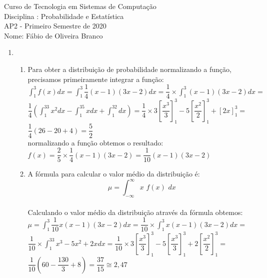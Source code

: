 \documentclass[a4paper, 12pt]{article}
\begin{document}
\begin{center}
Curso de Tecnologia em Sistemas de Computação \\
Disciplina : Probabilidade e Estatística \\
AP2 - Primeiro Semestre de 2020 \\
Nome: Fábio de Oliveira Branco\\ 
\end{center}


\begin{enumerate}
\item \begin{enumerate}
\item Para obter a distribuição de probabilidade normalizando a função, precisamos primeiramente integrar a função:\\
$\int_{1}^{3} f(x)dx = \int _1^3\dfrac{1}{4}\left(x-1\right)\left(3x-2\right)dx= \dfrac{1}{4}\times \int _1^3\left(x-1\right)\left(3x-2\right)dx=$\\
$\dfrac{1}{4}\left(\int _1^33x^2dx-\int _1^35xdx+\int _1^32dx\right)= \dfrac{1}{4} \times 3\left[\dfrac{x^3}{3}\right]^3_1 - 5\left[\dfrac{x^2}{2}\right]^3_1 + \left[2x\right]^3_1 =$\\
$\dfrac{1}{4}\left(26-20+4\right) = \dfrac{5}{2}$ \\ 

normalizando a função obtemos o resultado: \\
$f(x)= \dfrac{2}{5} \times \dfrac{1}{4}(x-1)(3x-2) = \dfrac{1}{10}(x-1)(3x-2)$

\item A fórmula para calcular o valor médio da distribuição é:\\ $$\mu =  \int _{-\infty}^{\infty}x \,\, f(x) \,\, dx$$\\ 
Calculando o valor médio da distribuição através da fórmula obtemos: \\
$\mu = \int _1^3\dfrac{1}{10}x\left(x-1\right)\left(3x-2\right)dx = \dfrac{1}{10}\times \int _1^3x\left(x-1\right)\left(3x-2\right)dx =$\\
$\dfrac{1}{10}\times \int _1^33x^3-5x^2+2xdx =\dfrac{1}{10} \times 3\left[\dfrac{x^3}{3}\right]^3_1 -5\left[\dfrac{x^3}{3}\right]^3_1 + 2\left[\dfrac{x^2}{2}\right]^3_1 =  $ \\
$\dfrac{1}{10}\left(60-\dfrac{130}{3}+8\right) = \dfrac{37}{15} \cong 2,47$
\end{enumerate}
	
	 
\end{enumerate}

 
\end{document}
